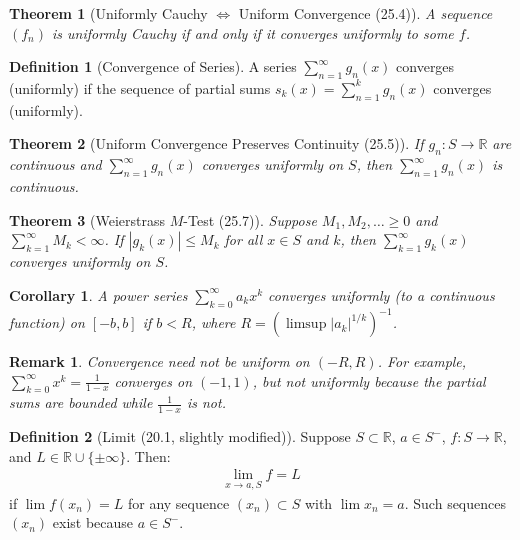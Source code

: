 \documentclass[7pt]{article}
\theoremstyle{definition}
\newtheorem{definition}{Definition}
\theoremstyle{plain}
\newtheorem{theorem}{Theorem}
\newtheorem{corollary}{Corollary}
\newtheorem{remark}{Remark}
\begin{document}
\begin{theorem}[Uniformly Cauchy $ \iff $ Uniform Convergence (25.4)]
A sequence $ (f_n) $ is uniformly Cauchy if and only if it converges uniformly to some $ f $.
\end{theorem}

\begin{definition}[Convergence of Series]
A series $ \sum_{n=1}^\infty g_n(x) $ converges (uniformly) if the sequence of partial sums $ s_k(x) = \sum_{n=1}^k g_n(x) $ converges (uniformly).
\end{definition}

\begin{theorem}[Uniform Convergence Preserves Continuity (25.5)]
If $ g_n : S \to \mathbb{R} $ are continuous and $ \sum_{n=1}^\infty g_n(x) $ converges uniformly on $ S $, then $ \sum_{n=1}^\infty g_n(x) $ is continuous.
\end{theorem}

\begin{theorem}[Weierstrass $ M $-Test (25.7)]
Suppose $ M_1, M_2, \ldots \geq 0 $ and $ \sum_{k=1}^\infty M_k < \infty $. If $ |g_k(x)| \leq M_k $ for all $ x \in S $ and $ k $, then $ \sum_{k=1}^\infty g_k(x) $ converges uniformly on $ S $.
\end{theorem}

\begin{corollary}
A power series $ \sum_{k=0}^\infty a_k x^k $ converges uniformly (to a continuous function) on $ [-b, b] $ if $ b < R $, where $ R = (\limsup |a_k|^{1/k})^{-1} $.
\end{corollary}

\begin{remark}
Convergence need not be uniform on $ (-R, R) $. For example, $ \sum_{k=0}^\infty x^k = \frac{1}{1-x} $ converges on $ (-1, 1) $, but not uniformly because the partial sums are bounded while $ \frac{1}{1-x} $ is not.
\end{remark}

\begin{definition}[Limit (20.1, slightly modified)]
Suppose $ S \subset \mathbb{R} $, $ a \in S^- $, $ f : S \to \mathbb{R} $, and $ L \in \mathbb{R} \cup \{\pm \infty\} $. Then:
\begin{align}
\lim_{x \to a, S} f = L
\end{align}
if $ \lim f(x_n) = L $ for any sequence $ (x_n) \subset S $ with $ \lim x_n = a $. Such sequences $ (x_n) $ exist because $ a \in S^- $.
\end{definition}
\end{document}
